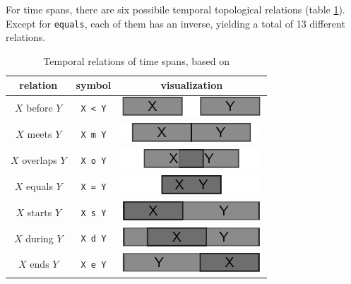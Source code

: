 For time spans, there are six possibile temporal topological relations (table \ref{tab:temporal_relations}). Except for \texttt{equals}, each of them has an inverse, yielding a total of 13 different relations.

\begin{table}[H]
\begin{center}
\begin{tabular}{c c c}
    relation & symbol & visualization \\
    \midrule
    $X$ before $Y$ &    \texttt{X < Y} & \raisebox{-0.25\height}
    {\includegraphics{graphics/basics/temporal_relations/before}} \\
    $X$ meets $Y$ &     \texttt{X m Y} & \raisebox{-0.25\height}
    {\includegraphics{graphics/basics/temporal_relations/meets}} \\
    $X$ overlaps $Y$ &  \texttt{X o Y} & \raisebox{-0.25\height}
    {\includegraphics{graphics/basics/temporal_relations/overlaps}} \\
    $X$ equals $Y$ &    \texttt{X = Y} & \raisebox{-0.25\height}
    {\includegraphics{graphics/basics/temporal_relations/equals}} \\
    $X$ starts $Y$ &    \texttt{X s Y} & \raisebox{-0.25\height}
    {\includegraphics{graphics/basics/temporal_relations/starts}} \\
    $X$ during $Y$ &    \texttt{X d Y} & \raisebox{-0.25\height}
    {\includegraphics{graphics/basics/temporal_relations/during}} \\
    $X$ ends $Y$ &      \texttt{X e Y} & \raisebox{-0.25\height}
    {\includegraphics{graphics/basics/temporal_relations/ends}} \\
\end{tabular}
\caption{Temporal relations of time spans, based on \cite{allen84theoryofactionandtime}}
\label{tab:temporal_relations}
\end{center}
\end{table}

